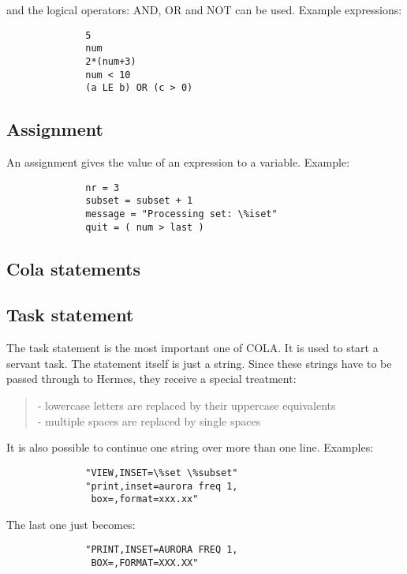 and the logical operators:  AND,  OR  and NOT can be used.
Example expressions:
\begin{verbatim}
              5
              num
              2*(num+3)
              num < 10
              (a LE b) OR (c > 0)
\end{verbatim}

\subsection*{Assignment}

An assignment gives the value of an expression to a variable.
Example:
\begin{verbatim}
              nr = 3
              subset = subset + 1
              message = "Processing set: \%iset"
              quit = ( num > last )
\end{verbatim}

\subsection{Cola statements}
\subsection*{Task statement}

The task statement is the most important one of COLA.
It is used to start a servant task. The statement itself is
just a string. Since these strings have to be passed through
to Hermes, they receive a special treatment:

\begin{verse}
     - lowercase letters are replaced by their uppercase equivalents\\
     - multiple spaces are replaced by single spaces\\
\end{verse}

It is also possible to continue one string over more than one line.
Examples:
\begin{verbatim}
              "VIEW,INSET=\%set \%subset"
              "print,inset=aurora freq 1,
               box=,format=xxx.xx"
\end{verbatim}

The last one just becomes: 

\begin{verbatim}
              "PRINT,INSET=AURORA FREQ 1,
               BOX=,FORMAT=XXX.XX"
\end{verbatim}

